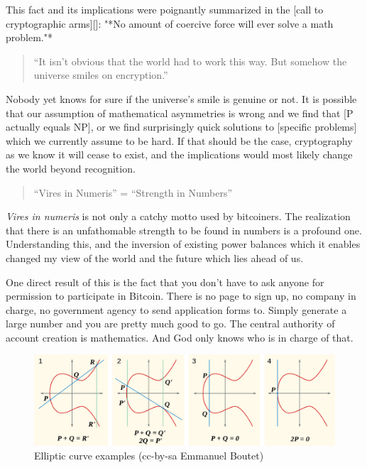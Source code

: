 This fact and its implications were poignantly summarized in the [call
to cryptographic arms][]: "*No amount of coercive force will ever solve
a math problem."*

\begin{quotation}
``It isn't obvious that the world had to work this way. But somehow the
universe smiles on encryption.''
\end{quotation}

Nobody yet knows for sure if the universe's smile is genuine or not. It
is possible that our assumption of mathematical asymmetries is wrong and
we find that [P actually equals NP], or we find surprisingly quick
solutions to [specific problems] which we currently assume to be hard.
If that should be the case, cryptography as we know it will cease to
exist, and the implications would most likely change the world beyond
recognition.

\begin{quotation}
``Vires in Numeris'' = ``Strength in Numbers''
\end{quotation}

\textit{Vires in numeris} is not only a catchy motto used by bitcoiners. The
realization that there is an unfathomable strength to be found in
numbers is a profound one. Understanding this, and the inversion of
existing power balances which it enables changed my view of the world
and the future which lies ahead of us.

One direct result of this is the fact that you don't have to ask anyone
for permission to participate in Bitcoin. There is no page to sign up,
no company in charge, no government agency to send application forms to.
Simply generate a large number and you are pretty much good to go. The
central authority of account creation is mathematics. And God only knows
who is in charge of that.

\begin{figure}
  \includegraphics{assets/images/elliptic-curve-examples.png}
  \caption{Elliptic curve examples (cc-by-sa Emmanuel Boutet)}
  \label{fig:elliptic-curve-examples}
\end{figure}

